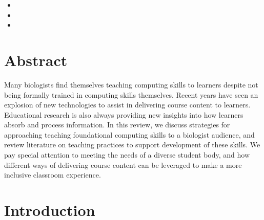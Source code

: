 \begin{itemize}
    \item {}
    \item {}
    \item {}  
\end{itemize}


\section{Abstract}\label{sect:Abstract}

Many biologists find themselves teaching computing skills to  learners despite not being formally trained in computing skills themselves. 
Recent years have seen an explosion of new technologies to assist in delivering course content to learners.
Educational research is also always providing new insights into how learners absorb and process information.
In this review, we discuss strategies for approaching teaching foundational computing skills to a biologist audience, and review literature on teaching practices to support development of these skills.
We pay special attention to meeting the needs of a diverse student body, and how different ways of delivering course content can be leveraged to make a more inclusive classroom experience.

\bigskip


\bigskip
\section{Introduction}\label{sect:Introduction}


